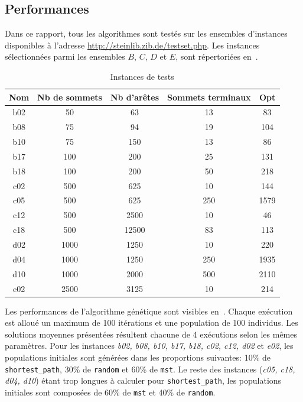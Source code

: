 \documentclass[10pt]{article}
\begin{document}
	\subsection{Performances}
	\label{sec-perf}
	
	Dans ce rapport, tous les algorithmes sont testés sur les ensembles d'instances disponibles à l'adresse \url{http://steinlib.zib.de/testset.php}. Les instances sélectionnées parmi les ensembles $B$, $C$, $D$ et $E$, sont répertoriées en~.
	
	\begin{table}[h!]
		\centering
		\begin{tabular}{|c|c|c|c|c|}
			\hline
			\textbf{Nom} & \textbf{Nb de sommets} & \textbf{Nb d'arêtes} & \textbf{Sommets terminaux} & \textbf{Opt} \\
			\hline
			b02 & 50 & 63 & 13 & 83 \\
			b08	& 75 & 94 &	19 & 104 \\
			b10	& 75 & 150 & 13 & 86 \\
			b17	& 100 &	200 & 25 & 131 \\
			b18	& 100 & 200 & 50 & 218 \\
			c02	& 500 & 625 & 10 & 144 \\
			c05	& 500 & 625 & 250 & 1579 \\
			c12	& 500 & 2500 & 10 & 46 \\
			c18 & 500 & 12500 & 83 & 113 \\
			d02	& 1000 & 1250 & 10 & 220 \\
			d04	& 1000 & 1250 & 250 & 1935 \\
			d10	& 1000 & 2000 &	500 & 2110 \\
			e02	& 2500 & 3125 & 10 & 214 \\
			\hline
		\end{tabular}
		\caption{Instances de tests}
		\label{tab-instances}
	\end{table}
	
	Les performances de l'algorithme génétique sont visibles en~. Chaque exécution est alloué un maximum de 100 itérations et une population de 100 individus. Les solutions moyennes présentées résultent chacune de 4 exécutions selon les mêmes paramètres.
	    Pour les instances \textit{b02, b08, b10, b17, b18, c02, c12, d02} et \textit{e02}, les populations initiales sont générées dans les proportions suivantes: 10\% de \texttt{shortest\_path}, 30\% de \texttt{random} et 60\% de \texttt{mst}. Le reste des instances (\textit{c05, c18, d04, d10}) étant trop longues à calculer pour \texttt{shortest\_path}, les populations initiales sont composées de 60\% de \texttt{mst} et 40\% de \texttt{random}.
\end{document}

